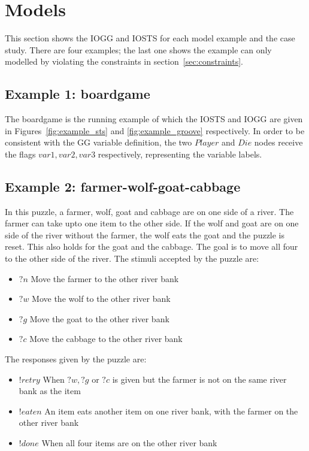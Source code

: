 \section{Models}\label{sec:model-examples}
This section shows the IOGG and IOSTS for each model example and the case study. There are four examples; the last one shows the example can only modelled by violating the constraints in section~\ref{sec:constraints}. 

\subsection{Example 1: boardgame}
The boardgame is the running example of which the IOSTS and IOGG are given in Figures~\ref{fig:example_sts} and \ref{fig:example_groove} respectively. In order to be consistent with the GG variable definition, the two $Player$ and $Die$ nodes receive the flags $\mathit{var1, var2, var3}$ respectively, representing the variable labels.

\subsection{Example 2: farmer-wolf-goat-cabbage}\label{sec:fwgc}
In this puzzle, a farmer, wolf, goat and cabbage are on one side of a river. The farmer can take upto one item to the other side. If the wolf and goat are on one side of the river without the farmer, the wolf eats the goat and the puzzle is reset. This also holds for the goat and the cabbage. The goal is to move all four to the other side of the river. The stimuli accepted by the puzzle are:
\begin{itemize}
\item $?n$ Move the farmer to the other river bank
\item $?w$ Move the wolf to the other river bank
\item $?g$ Move the goat to the other river bank
\item $?c$ Move the cabbage to the other river bank
\end{itemize}
The responses given by the puzzle are:
\begin{itemize}
\item $!retry$ When $?w, ?g$ or $?c$ is given but the farmer is not on the same river bank as the item
\item $!eaten$ An item eats another item on one river bank, with the farmer on the other river bank 
\item $!done$ When all four items are on the other river bank
\end{itemize}

